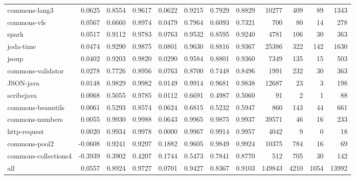 \begin{table*}
\begin{tabular}{lrrrrrrrrrrr}
          commons-lang3 &      0.0625 &  0.8554 &     0.9617 &     0.0622 &  0.9215 &     0.7929 &   0.8829 &   10277 &   409 &    89 &   1343 \\
            commons-vfs &      0.0567 &  0.6660 &     0.8974 &     0.0479 &  0.7964 &     0.6093 &   0.7321 &     700 &    80 &    14 &    278 \\
                  spark &      0.0517 &  0.9112 &     0.9783 &     0.0763 &  0.9532 &     0.8595 &   0.9240 &    4781 &   106 &    30 &    363 \\
              joda-time &      0.0474 &  0.9290 &     0.9875 &     0.0801 &  0.9630 &     0.8816 &   0.9367 &   25386 &   322 &   142 &   1630 \\
                  jsoup &      0.0402 &  0.9203 &     0.9820 &     0.0290 &  0.9584 &     0.8801 &   0.9360 &    7349 &   135 &    15 &    503 \\
      commons-validator &      0.0278 &  0.7726 &     0.8956 &     0.0763 &  0.8700 &     0.7448 &   0.8496 &    1991 &   232 &    30 &    363 \\
              JSON-java &      0.0148 &  0.9829 &     0.9982 &     0.0149 &  0.9914 &     0.9681 &   0.9838 &   12687 &    23 &     3 &    198 \\
             scribejava &      0.0068 &  0.5055 &     0.9785 &     0.0112 &  0.6691 &     0.4987 &   0.5060 &      91 &     2 &     1 &     88 \\
      commons-beanutils &      0.0061 &  0.5293 &     0.8574 &     0.0624 &  0.6815 &     0.5232 &   0.5947 &     860 &   143 &    44 &    661 \\
        commons-numbers &      0.0055 &  0.9930 &     0.9988 &     0.0643 &  0.9965 &     0.9875 &   0.9937 &   39571 &    46 &    16 &    233 \\
           http-request &      0.0020 &  0.9934 &     0.9978 &     0.0000 &  0.9967 &     0.9914 &   0.9957 &    4042 &     9 &     0 &     18 \\
          commons-pool2 &     -0.0608 &  0.9241 &     0.9297 &     0.1882 &  0.9605 &     0.9849 &   0.9924 &   10375 &   784 &    16 &     69 \\
   commons-collections4 &     -0.3939 &  0.3902 &     0.4207 &     0.1744 &  0.5473 &     0.7841 &   0.8770 &     512 &   705 &    30 &    142 \\
                    all &      0.0557 &  0.8924 &     0.9727 &     0.0701 &  0.9427 &     0.8367 &   0.9103 &  149843 &  4210 &  1054 &  13992 \\
\bottomrule
\end{tabular}
\end{table*}
